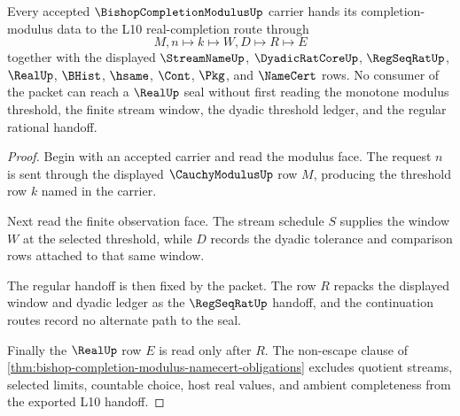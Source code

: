 \begin{theorem}
\label{thm:bishop-completion-modulus-l10-handoff}
Every accepted $\BishopCompletionModulusUp$ carrier hands its completion-modulus data to the L10 real-completion route through
$$
M,n\longmapsto k\longmapsto W,D\longmapsto R\longmapsto E
$$
together with the displayed $\StreamNameUp$, $\DyadicRatCoreUp$, $\RegSeqRatUp$, $\RealUp$, $\BHist$, $\hsame$, $\Cont$, $\Pkg$, and $\NameCert$ rows. No consumer of the packet can reach a $\RealUp$ seal without first reading the monotone modulus threshold, the finite stream window, the dyadic threshold ledger, and the regular rational handoff.
\end{theorem}
\begin{proof}
Begin with an accepted carrier and read the modulus face. The request $n$ is sent through the displayed $\CauchyModulusUp$ row $M$, producing the threshold row $k$ named in the carrier.

Next read the finite observation face. The stream schedule $S$ supplies the window $W$ at the selected threshold, while $D$ records the dyadic tolerance and comparison rows attached to that same window.

The regular handoff is then fixed by the packet. The row $R$ repacks the displayed window and dyadic ledger as the $\RegSeqRatUp$ handoff, and the continuation routes record no alternate path to the seal.

Finally the $\RealUp$ row $E$ is read only after $R$. The non-escape clause of \autoref{thm:bishop-completion-modulus-namecert-obligations} excludes quotient streams, selected limits, countable choice, host real values, and ambient completeness from the exported L10 handoff.
\end{proof}

